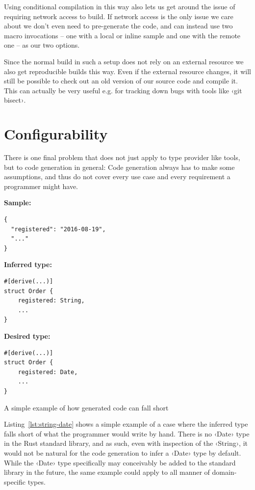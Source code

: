 Using conditional compilation in this way also lets us get around the issue of requiring network access to build. If network access is the only issue we care about we don't even need to pre-generate the code, and can instead use two macro invocations -- one with a local or inline sample and one with the remote one -- as our two options.

Since the normal build in such a setup does not rely on an external resource we also get reproducible builds this way. Even if the external resource changes, it will still be possible to check out an old version of our source code and compile it. This can actually be very useful e.g. for tracking down bugs with tools like ‹git bisect›.

\section{Configurability}

There is one final problem that does not just apply to type provider like tools, but to code generation in general: Code generation always has to make some assumptions, and thus do not cover every use case and every requirement a programmer might have.

\begin{listing}[ht!]
\textbf{Sample:}
\begin{verbatim}
{
  "registered": "2016-08-19",
  "..."
}
\end{verbatim}
\vspace{5mm}

\textbf{Inferred type:}
\begin{verbatim}
#[derive(...)]
struct Order {
    registered: String,
    ...
}
\end{verbatim}
\vspace{5mm}

\textbf{Desired type:}
\begin{verbatim}
#[derive(...)]
struct Order {
    registered: Date,
    ...
}
\end{verbatim}
\caption{A simple example of how generated code can fall short}
\label{lst:string-date}
\end{listing}

Listing~\ref{lst:string-date} shows a simple example of a case where the inferred type falls short of what the programmer would write by hand. There is no ‹Date› type in the Rust standard library, and as such, even with inspection of the ‹String›, it would not be natural for the code generation to infer a ‹Date› type by default. While the ‹Date› type specifically may conceivably be added to the standard library in the future, the same example could apply to all manner of domain-specific types.

